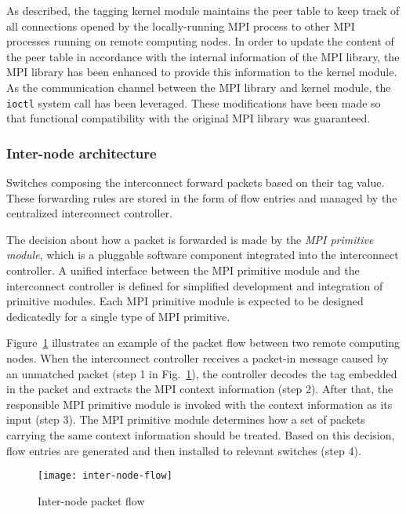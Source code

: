 As described, the tagging kernel module maintains the peer table to keep
track of all connections opened by the locally-running MPI process to
other MPI processes running on remote computing nodes. In order to
update the content of the peer table in accordance with the internal
information of the MPI library, the MPI library has been enhanced to
provide this information to the kernel module. As the communication
channel between the MPI library and kernel module, the
\lstinline!ioctl! system call has been leveraged. These
modifications have been made so that functional compatibility with the
original MPI library was guaranteed.

\subsubsection{Inter-node architecture}

Switches composing the interconnect forward packets based on their tag
value. These forwarding rules are stored in the form of flow entries and
managed by the centralized interconnect controller.

The decision about how a packet is forwarded is made by the \emph{MPI
primitive module}, which is a pluggable software component integrated
into the interconnect controller. A unified interface between the MPI
primitive module and the interconnect controller is defined for
simplified development and integration of primitive modules. Each MPI
primitive module is expected to be designed dedicatedly for a single
type of MPI primitive.

Figure~\ref{fig:inter-node-flow} illustrates an example of the packet
flow between two remote computing nodes. When the interconnect
controller receives a packet-in message caused by an unmatched packet
(step 1 in Fig.~\ref{fig:inter-node-flow}), the controller decodes the
tag embedded in the packet and extracts the MPI context information
(step 2). After that, the responsible MPI primitive module is invoked
with the context information as its input (step 3). The MPI primitive
module determines how a set of packets carrying the same context
information should be treated. Based on this decision, flow entries are
generated and then installed to relevant switches (step 4).

\begin{figure}
    \centering
    \texttt{[image: inter-node-flow]}
    \caption{Inter-node packet flow}%
    \label{fig:inter-node-flow}
\end{figure}

